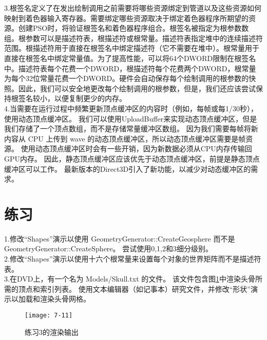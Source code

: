\begin{flushleft}
3.根签名定义了在发出绘制调用之前需要将哪些资源绑定到管道以及这些资源如何映射到着色器输入寄存器。需要绑定哪些资源取决于绑定着色器程序所期望的资源。创建PSO时，将验证根签名和着色器程序组合。根签名被指定为根参数数组。根参数可以是描述符表，根描述符或根常量。描述符表指定堆中的连续描述符范围。根描述符用于直接在根签名中绑定描述符（它不需要在堆中）。根常量用于直接在根签名中绑定常量值。为了提高性能，可以将64个DWORD限制在根签名中。描述符表每个花费一个DWORD，根描述符每个花费两个DWORD，根常量为每个32位常量花费一个DWORD。硬件会自动保存每个绘制调用的根参数的快照。因此，我们可以安全地更改每个绘制调用的根参数，但是，我们还应该尝试保持根签名较小，以便复制更少的内存。\\
4.当需要在运行过程中频繁更新顶点缓冲区的内容时（例如，每帧或每1/30秒），使用动态顶点缓冲区。 我们可以使用UploadBuffer来实现动态顶点缓冲区，但是我们存储了一个顶点数组，而不是存储常量缓冲区数组。 因为我们需要每帧将新内容从 CPU 上传到 wave 的动态顶点缓冲区，所以动态顶点缓冲区需要是帧资源。 使用动态顶点缓冲区时会有一些开销，因为新数据必须从CPU内存传输回GPU内存。 因此，静态顶点缓冲区应该优先于动态顶点缓冲区，前提是静态顶点缓冲区可以工作。 最新版本的Direct3D引入了新功能，以减少对动态缓冲区的需求。\\
\end{flushleft}

\section{练习}
\begin{flushleft}
1.修改“Shapes”演示以使用 GeometryGenerator::CreateGeosphere 而不是 GeometryGenerator::CreateSphere。 尝试使用0,1,2和3细分级别。\\
2.修改“Shapes”演示以使用十六个根常量来设置每个对象的世界矩阵而不是描述符表。\\
3.在DVD上，有一个名为 Models/Skull.txt 的文件。 该文件包含图\ref{fig:7-11}中渲染头骨所需的顶点和索引列表。 使用文本编辑器（如记事本）研究文件，并修改“形状”演示以加载和渲染头骨网格。
\end{flushleft}

\begin{figure}[h]
    \texttt{[image: 7-11]}
    \centering
    \caption{练习3的渲染输出}
    \label{fig:7-11}
\end{figure}













